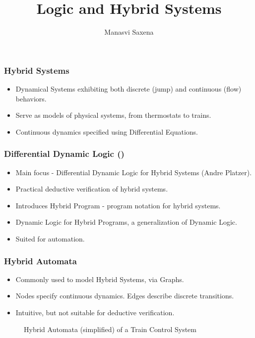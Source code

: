 \documentclass{beamer}
\title{Logic and Hybrid Systems}
\author{Manasvi Saxena}
\institute{Formal Systems Lab, UIUC}
\date{}
\newcommand{\dL}{\text{\upshape\textsf{d{\kern-0.05em}L}}}
\begin{document}
\frame{\titlepage}

\begin{frame}
\frametitle{Hybrid Systems}

\begin{itemize}
  \item Dynamical Systems exhibiting both discrete (jump) and continuous (flow) behaviors.
  \item Serve as models of physical systems, from thermostats to trains.
  \item Continuous dynamics specified using Differential Equations.
\end{itemize}

\end{frame}

\begin{frame}
  \frametitle{Differential Dynamic Logic (\dL)}
  \begin{itemize}
    \item Main focus - Differential Dynamic Logic for Hybrid Systems (Andre
      Platzer).
      \pause
    \item Practical deductive verification of hybrid systems.
      \pause
    \item Introduces Hybrid Program - program notation for hybrid systems.
      \pause
    \item Dynamic Logic for Hybrid Programs, a generalization of Dynamic Logic.
      \pause
    \item Suited for automation.
  \end{itemize}

\end{frame}

\begin{frame}
\frametitle{Hybrid Automata}
\begin{itemize}
  \item Commonly used to model Hybrid Systems, via Graphs.
  \item Nodes specify continuous dynamics. Edges describe discrete transitions.
  \item Intuitive, but not suitable for deductive verification.
\end{itemize}
    \pause
\begin{figure}\label{fig:train-HA}
  \centering
  \begin{tikzpicture}[shorten >=1pt,node distance=5cm,on grid,auto]
    
  \end{tikzpicture}
  \caption{Hybrid Automata (simplified) of a Train Control System}
\end{figure}
\end{frame}
\end{document}
